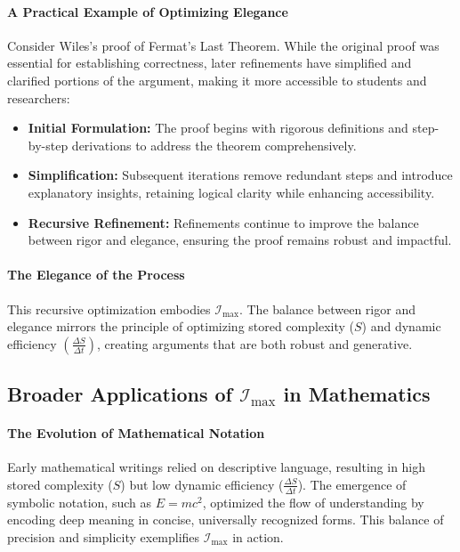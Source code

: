 \documentclass[12pt]{article}
\begin{document}
\paragraph{A Practical Example of Optimizing Elegance}
Consider Wiles’s proof of Fermat’s Last Theorem. While the original proof was essential for establishing correctness, later refinements have simplified and clarified portions of the argument, making it more accessible to students and researchers:
\begin{itemize}
    \item \textbf{Initial Formulation:} The proof begins with rigorous definitions and step-by-step derivations to address the theorem comprehensively.
    \item \textbf{Simplification:} Subsequent iterations remove redundant steps and introduce explanatory insights, retaining logical clarity while enhancing accessibility.
    \item \textbf{Recursive Refinement:} Refinements continue to improve the balance between rigor and elegance, ensuring the proof remains robust and impactful.
\end{itemize}

\paragraph{The Elegance of the Process}
This recursive optimization embodies \(\mathcal{I}_{\text{max}}\). The balance between rigor and elegance mirrors the principle of optimizing stored complexity (\(S\)) and dynamic efficiency \(\left(\frac{\Delta S}{\Delta t}\right)\), creating arguments that are both robust and generative.

\subsection{Broader Applications of \(\mathcal{I}_{\text{max}}\) in Mathematics}

\paragraph{The Evolution of Mathematical Notation}
Early mathematical writings relied on descriptive language, resulting in high stored complexity (\(S\)) but low dynamic efficiency (\(\frac{\Delta S}{\Delta t}\)). The emergence of symbolic notation, such as \(E = mc^2\), optimized the flow of understanding by encoding deep meaning in concise, universally recognized forms. This balance of precision and simplicity exemplifies \(\mathcal{I}_{\text{max}}\) in action.
\end{document}
